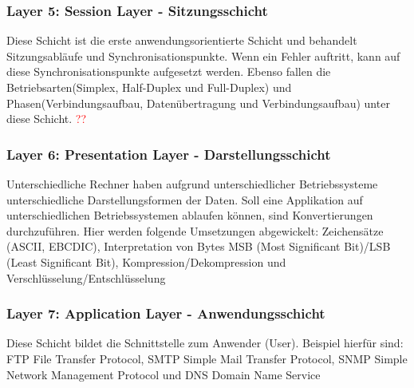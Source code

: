 \documentclass[12pt,a4paper]{article}
\begin{document}
			\subsubsection{Layer 5: Session Layer - Sitzungsschicht}
				Diese Schicht ist die erste anwendungsorientierte Schicht und behandelt Sitzungsabläufe und Synchronisationspunkte. Wenn ein Fehler auftritt, kann auf diese Synchronisationspunkte aufgesetzt werden. Ebenso fallen die Betriebsarten(Simplex, Half-Duplex und Full-Duplex) und Phasen(Verbindungsaufbau, Datenübertragung und Verbindungsaufbau) unter diese Schicht. \textcolor{red}{??}

			\subsubsection{Layer 6: Presentation Layer - Darstellungsschicht}
				Unterschiedliche Rechner haben aufgrund unterschiedlicher Betriebssysteme unterschiedliche Darstellungsformen der Daten. Soll eine Applikation auf unterschiedlichen Betriebssystemen ablaufen können, sind Konvertierungen durchzuführen.
				Hier werden folgende Umsetzungen abgewickelt:\newline
				Zeichensätze (ASCII, EBCDIC), Interpretation von Bytes MSB (Most Significant Bit)/LSB (Least Significant Bit), Kompression/Dekompression und Verschlüsselung/Entschlüsselung

			\subsubsection{Layer 7: Application Layer - Anwendungsschicht}
			Diese Schicht bildet die Schnittstelle zum Anwender (User). Beispiel hierfür sind:\newline
			FTP File Transfer Protocol, SMTP Simple Mail Transfer Protocol, SNMP Simple Network Management Protocol und DNS Domain Name Service
	
	\newpage
\end{document}
